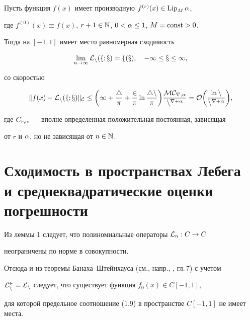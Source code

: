 \begin{cor} 


Пусть функция $f(x)$ имеет производную $f^{(r)}(x)\in \operatorname{Lip}_M\alpha$,


где $f^{(0)}(x)\equiv f(x)$, $r+1\in \Bbb{N}$, $0<\alpha\le 1$, $M=\operatorname{const} > 0$.


Тогда на $[-1,1]$ имеет место равномерная сходимость


\begin{equation}


\lim_{n\to \infty}\cal{L}_n(f;x)=f(x),\quad -1\le x\le 1,


\end{equation}


со скоростью


\begin{equation}


\|f(x) - \cal{L}_n(f;x)\|_C \le \bigg(1+\frac{4}{\pi}+\frac{2}{\pi}\ln


\frac{4n}{\pi}\bigg)\frac{MC_{r,\al}}{n^{r+\al}}=


O\bigg(\frac{\ln n}{n^{r+\al}}\bigg),


\end{equation}


где $C_{r,\alpha}$ --- вполне определенная положительная постоянная, зависящая 


от $r$ и $\alpha$, но не зависящая от $n\in\Bbb{N}$.


\end{cor}








\section{Сходимость в пространствах Лебега\protect\\


и среднеквадратические оценки погрешности}





Из леммы 1 следует, что полиномиальные операторы ${\cal L}_n:C\to C$ 


неограничены по норме в совокупности.


Отсюда и из теоремы Банаха--Штейнхауса (см., напр., \cite{11}, гл.\,7) с учетом


$\cal{L}_n^2=\cal{L}_n$ следует, что существует функция $f_0(x)\in C[-1,1]$,


для которой предельное соотношение (1.9) в пространстве $C[-1,1]$ не имеет места.


